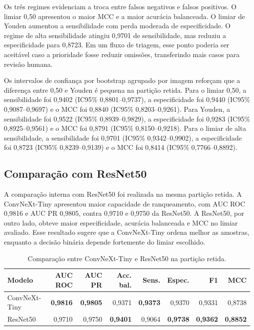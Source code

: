 Os três regimes evidenciam a troca entre falsos negativos e falsos positivos. O
limiar 0,50 apresentou o maior MCC e a maior acurácia balanceada. O limiar de
Youden aumentou a sensibilidade com perda moderada de especificidade. O regime
de alta sensibilidade atingiu 0,9701 de sensibilidade, mas reduziu a
especificidade para 0,8723. Em um fluxo de triagem, esse ponto poderia ser
aceitável caso a prioridade fosse reduzir omissões, transferindo mais casos para
revisão humana.

Os intervalos de confiança por bootstrap agrupado por imagem reforçam que a
diferença entre 0,50 e Youden é pequena na partição retida. Para o limiar 0,50,
a sensibilidade foi 0,9402 (IC95\% 0,8801--0,9737), a especificidade foi 0,9440
(IC95\% 0,9087--0,9697) e o MCC foi 0,8840 (IC95\% 0,8203--0,9261). Para Youden,
a sensibilidade foi 0,9522 (IC95\% 0,8939--0,9829), a especificidade foi 0,9283
(IC95\% 0,8925--0,9561) e o MCC foi 0,8791 (IC95\% 0,8150--0,9218). Para o limiar
de alta sensibilidade, a sensibilidade foi 0,9701 (IC95\% 0,9342--0,9902), a
especificidade foi 0,8723 (IC95\% 0,8239--0,9139) e o MCC foi 0,8414 (IC95\%
0,7766--0,8892).

\subsection{Comparação com ResNet50}

A comparação interna com ResNet50 foi realizada na mesma partição retida. A
ConvNeXt-Tiny apresentou maior capacidade de ranqueamento, com AUC ROC 0,9816 e
AUC PR 0,9805, contra 0,9710 e 0,9750 da ResNet50. A ResNet50, por outro lado,
obteve maior especificidade, acurácia balanceada e MCC no limiar avaliado. Esse
resultado sugere que a ConvNeXt-Tiny ordena melhor as amostras, enquanto a
decisão binária depende fortemente do limiar escolhido.

\begin{table}[ht]
\centering
\caption{Comparação entre ConvNeXt-Tiny e ResNet50 na partição retida.}
\label{tab:baseline}
\kariellytablefont
\kariellytablecols
\begin{tabular}{lrrrrrrr}
\toprule
Modelo & AUC ROC & AUC PR & Acc. bal. & Sens. & Espec. & F1 & MCC \\
\midrule
ConvNeXt-Tiny & \textbf{0,9816} & \textbf{0,9805} & 0,9371 & \textbf{0,9373} &
0,9370 & 0,9331 & 0,8738 \\
ResNet50 & 0,9710 & 0,9750 & \textbf{0,9401} & 0,9064 & \textbf{0,9738} &
\textbf{0,9362} & \textbf{0,8852} \\
\bottomrule
\end{tabular}
\end{table}

